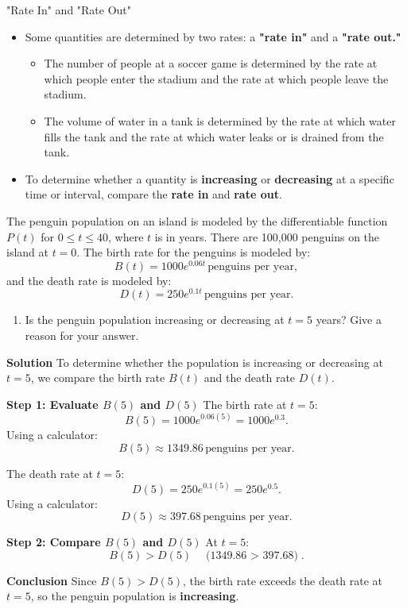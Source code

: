 \documentclass[12pt]{article}
\theoremstyle{beautifulthm}
\begin{document}
\begin{Note}{"Rate In" and "Rate Out" }{}


\begin{itemize}
    \item Some quantities are determined by two rates: a \textbf{"rate in"} and a \textbf{"rate out."}
    \begin{itemize}
        \item The number of people at a soccer game is determined by the rate at which people enter the stadium and the rate at which people leave the stadium.
        \item The volume of water in a tank is determined by the rate at which water fills the tank and the rate at which water leaks or is drained from the tank.
    \end{itemize}

    \item To determine whether a quantity is \textbf{increasing} or \textbf{decreasing} at a specific time or interval, compare the \textbf{rate in} and \textbf{rate out}.
\end{itemize}
\end{Note}



\begin{tcolorbox}[colback=examplebg, colframe=red!75!black, title=\textbf{EXAMPLE 1:Rates of Chang}, fonttitle=\bfseries, sharp corners]
The penguin population on an island is modeled by the differentiable function \( P(t) \) for \( 0 \leq t \leq 40 \), where \( t \) is in years. There are 100,000 penguins on the island at \( t = 0 \). The birth rate for the penguins is modeled by:
\[
B(t) = 1000e^{0.06t} \, \text{penguins per year},
\]
and the death rate is modeled by:
\[
D(t) = 250e^{0.1t} \, \text{penguins per year}.
\]

\begin{enumerate}
    \item[(a)] Is the penguin population increasing or decreasing at \( t = 5 \) years? Give a reason for your answer.
\end{enumerate}

\tcblower
\textbf{Solution}
To determine whether the population is increasing or decreasing at \( t = 5 \), we compare the birth rate \( B(t) \) and the death rate \( D(t) \).

\textbf{Step 1: Evaluate \( B(5) \) and \( D(5) \)}
The birth rate at \( t = 5 \):
\[
B(5) = 1000e^{0.06(5)} = 1000e^{0.3}.
\]
Using a calculator:
\[
B(5) \approx 1349.86 \, \text{penguins per year}.
\]

The death rate at \( t = 5 \):
\[
D(5) = 250e^{0.1(5)} = 250e^{0.5}.
\]
Using a calculator:
\[
D(5) \approx 397.68 \, \text{penguins per year}.
\]

\textbf*{Step 2: Compare \( B(5) \) and \( D(5) \)}
At \( t = 5 \):
\[
B(5) > D(5) \quad \text{(1349.86 $>$ 397.68)}.
\]

\textbf{Conclusion}
Since \( B(5) > D(5) \), the birth rate exceeds the death rate at \( t = 5 \), so the penguin population is \textbf{increasing}.

\end{tcolorbox}
\newpage
\end{document}
